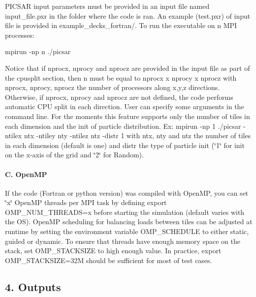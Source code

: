 P\+I\+C\+S\+AR input parameters must be provided in an input file named {\ttfamily input\+\_\+file.\+pxr} in the folder where the code is ran. An example ({\ttfamily test.\+pxr}) of input file is provided in {\ttfamily example\+\_\+decks\+\_\+fortran/}. To run the executable on n M\+PI processes\+: 
\begin{DoxyCode}
mpirun -np n ./picsar
\end{DoxyCode}
 Notice that if {\ttfamily nprocx}, {\ttfamily nprocy} and {\ttfamily nprocz} are provided in the input file as part of the {\ttfamily cpusplit} section, then n must be equal to {\ttfamily nprocx x nprocy x nprocz} with {\ttfamily nprocx}, {\ttfamily nprocy}, {\ttfamily nprocz} the number of processors along x,y,z directions. Otherwise, if {\ttfamily nprocx}, {\ttfamily nprocy} and {\ttfamily nprocz} are not defined, the code performs automatic C\+PU split in each direction. User can specify some arguments in the command line. For the moments this feature supports only the number of tiles in each dimension and the init of particle distribution. Ex\+: {\ttfamily mpirun -\/np 1 ./picsar -\/ntilex ntx -\/ntiley nty -\/ntilez ntz -\/distr 1} with {\ttfamily ntx}, {\ttfamily nty} and {\ttfamily ntz} the number of tiles in each dimension (default is one) and distr the type of particle init (\char`\"{}1\char`\"{} for init on the x-\/axis of the grid and \char`\"{}2\char`\"{} for Random).

\paragraph*{C. Open\+MP}

If the code (Fortran or python version) was compiled with Open\+MP, you can set \char`\"{}x\char`\"{} Open\+MP threads per M\+PI task by defining {\ttfamily export O\+M\+P\+\_\+\+N\+U\+M\+\_\+\+T\+H\+R\+E\+A\+DS=x} before starting the simulation (default varies with the OS). Open\+MP scheduling for balancing loads between tiles can be adjusted at runtime by setting the environment variable {\ttfamily O\+M\+P\+\_\+\+S\+C\+H\+E\+D\+U\+LE} to either {\ttfamily static}, {\ttfamily guided} or {\ttfamily dynamic}. To ensure that threads have enough memory space on the stack, set {\ttfamily O\+M\+P\+\_\+\+S\+T\+A\+C\+K\+S\+I\+ZE} to high enough value. In practice, {\ttfamily export O\+M\+P\+\_\+\+S\+T\+A\+C\+K\+S\+I\+ZE=32M} should be sufficient for most of test cases.

\subsection*{4. Outputs }


